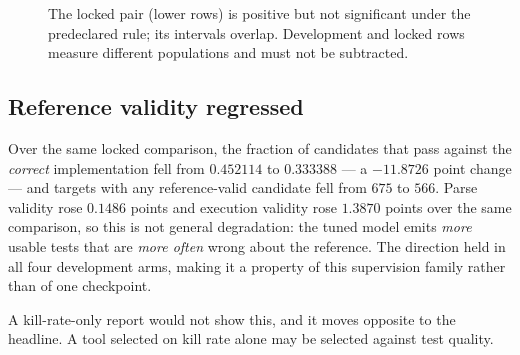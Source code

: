\documentclass[10pt,conference]{IEEEtran}
\makeatletter
\newcommand{\killk}[1]{Kill@#1}
\makeatother
\begin{document}
\begin{figure}[t]
\centering
\caption{The locked pair (lower rows) is positive but not significant under the
predeclared rule; its intervals overlap. Development and locked rows measure
different populations and must not be subtracted.}
\label{fig:cmp}
\end{figure}

\subsection{Reference validity regressed}

Over the same locked comparison, the fraction of candidates that pass against
the \emph{correct} implementation fell from $0.452114$ to $0.333388$ --- a
$-11.8726$ point change --- and targets with any reference-valid candidate fell
from $675$ to $566$. Parse validity rose $0.1486$ points and execution validity
rose $1.3870$ points over the same comparison, so this is not general
degradation: the tuned model emits \emph{more} usable tests that are
\emph{more often} wrong about the reference. The direction held in all four
development arms, making it a property of this supervision family rather than of
one checkpoint.

A kill-rate-only report would not show this, and it moves opposite to the
headline. A tool selected on kill rate alone may be selected against test
quality.
\end{document}

